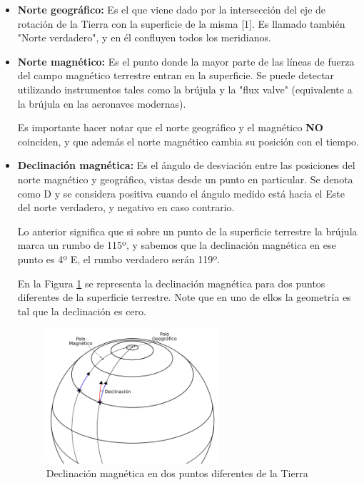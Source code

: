 \begin{itemize}
\item\textbf{ Norte geográfico: }Es el que viene dado por la intersección del eje de rotación de la Tierra con la superficie de la misma [1]. Es llamado también "Norte verdadero", y en él confluyen todos los meridianos.

\item \textbf{Norte magnético:} Es el punto donde la mayor parte de las líneas de fuerza del campo magnético terrestre entran en la superficie. Se puede detectar utilizando instrumentos tales como la brújula y la "flux valve" (equivalente a la brújula en las aeronaves modernas).

Es importante hacer notar que el norte geográfico y el magnético \textbf{NO} coinciden, y que además el norte magnético cambia su posición con el tiempo.

\item \textbf{Declinación magnética:} Es el ángulo de desviación entre las posiciones del norte magnético y geográfico, vistas desde un punto en particular. Se denota como D y se considera positiva cuando el ángulo medido está hacia el Este del norte verdadero, y negativo en caso contrario. 

Lo anterior significa que si sobre un punto de la superficie terrestre la brújula marca un rumbo de 115º, y sabemos que la declinación magnética en ese punto es 4º E, el rumbo verdadero serán 119º. 

En la Figura \ref{fig:declinacion-magnetica} se representa la declinación magnética para dos puntos diferentes de la superficie terrestre. Note que en uno de ellos la geometría es tal que la declinación es cero. 

\begin{figure}[!h]
    \centering
\includegraphics[keepaspectratio,width=0.6\textwidth]{./Imagenes/06.00.navegacion/declinacion-magnetica.png}
\caption{Declinaci\'on magn\'etica en dos puntos diferentes de la Tierra \cite{Salazar_nav_aerea}}
\label{fig:declinacion-magnetica}
\end{figure}


\end{itemize}
